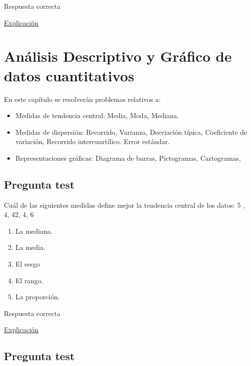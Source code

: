 \documentclass[
]{book}
\providecommand{\tightlist}{%
  \setlength{\itemsep}{0pt}\setlength{\parskip}{0pt}}
\begin{document}
Respuesta correcta

\href{https://es.wikipedia.org/wiki/Sesgo_de_selección}{Explicación}

\hypertarget{anuxe1lisis-descriptivo-y-gruxe1fico-de-datos-cuantitativos}{%
\chapter{Análisis Descriptivo y Gráfico de datos cuantitativos}\label{anuxe1lisis-descriptivo-y-gruxe1fico-de-datos-cuantitativos}}

En este capítulo se resolverán problemas relativos a:

\begin{itemize}
\tightlist
\item
  Medidas de tendencia central: Media, Moda, Mediana.
\item
  Medidas de dispersión: Recorrido, Varianza, Desviación típica, Coeficiente de variación, Recorrido intercuartílico. Error estándar.
\item
  Representaciones gráficas: Diagrama de barras, Pictogramas, Cartogramas,
\end{itemize}

\hypertarget{pregunta-test-49}{%
\section{Pregunta test}\label{pregunta-test-49}}

Cuál de las siguientes medidas define mejor la tendencia central de los datos: 5 , 4, 42, 4, 6

\begin{enumerate}
\def\labelenumi{\alph{enumi})}
\tightlist
\item
  La mediana.
\item
  La media.
\item
  El sesgo
\item
  El rango.
\item
  La proporción.
\end{enumerate}

Respuesta correcta

\href{https://1fjmanzano.github.io/bioestadistica/medidas-de-posicio\%CC\%81n-dispersio\%CC\%81n-y-forma.html\#medidas-de-posicio\%CC\%81n-centrales}{Explicación}

\hypertarget{pregunta-test-50}{%
\section{Pregunta test}\label{pregunta-test-50}}
\end{document}
